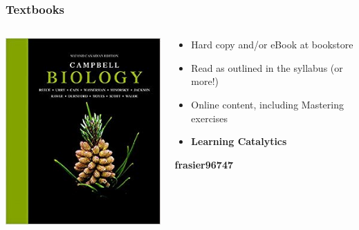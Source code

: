 \documentclass[10pt]{beamer}
\begin{document}
\begin{frame}
\frametitle{Textbooks}

	\begin{columns}
		\begin{column}{0.3\textwidth}
			\begin{center}
				\includegraphics[width=1.0\textwidth]{figures/campbell.jpg}
			\end{center}	
		\end{column}
		
		\begin{column}{0.7\textwidth}
			\begin{itemize}
				\item Hard copy and/or eBook at bookstore
				\bigskip
				\item Read as outlined in the syllabus (or more!)
				\bigskip
				\item Online content, including Mastering exercises
				\bigskip
				\item \textbf{Learning Catalytics}
			\end{itemize}
			
			\begin{center}
				\textbf{\textcolor{myblue}{frasier96747}}
			\end{center}
		\end{column}
	\end{columns}
\end{frame}
\end{document}
